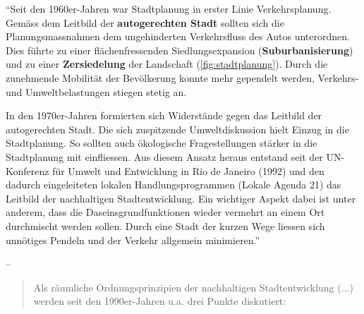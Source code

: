 \begin{textBox}[title=Stadt der kurzen Wege]
	``Seit den 1960er-Jahren war Stadtplanung in erster Linie Verkehrsplanung. Gemäss dem Leitbild der \textbf{autogerechten Stadt} sollten sich die Planungsmassnahmen dem ungehinderten Verkehrsfluss des Autos unterordnen. Dies führte zu einer flächenfressenden Siedlungsexpansion (\textbf{Suburbanisierung}) und zu einer \textbf{Zersiedelung} der Landschaft (\cref{fig:stadtplanung}). Durch die zunehmende Mobilität der Bevölkerung konnte mehr gependelt werden, Verkehrs- und Umweltbelastungen stiegen stetig an.

	In den 1970er-Jahren formierten sich Widerstände gegen das Leitbild der autogerechten Stadt. Die sich zuspitzende Umweltdiskussion hielt Einzug in die Stadtplanung. So sollten auch ökologische Fragestellungen stärker in die Stadtplanung mit einfliessen. Aus diesem Ansatz heraus entstand seit der UN-Konferenz für Umwelt und Entwicklung in Rio de Janeiro (1992) und den dadurch eingeleiteten lokalen Handlungsprogrammen (Lokale Agenda 21) das Leitbild der nachhaltigen Stadtentwicklung. Ein wichtiger Aspekt dabei ist unter anderem, dass die Daseinsgrundfunktionen wieder vermehrt an einem Ort durchmischt werden sollen. Durch eine Stadt der kurzen Wege liessen sich unnötiges Pendeln und der Verkehr allgemein minimieren.''

	--\textcite{westermann}

	\begin{quotation}
		Als räumliche Ordnungsprinzipien der nachhaltigen Stadtentwicklung (...) werden seit den
		1990er-Jahren u.a. drei Punkte diskutiert:


\end{quotation}
\end{textBox}
